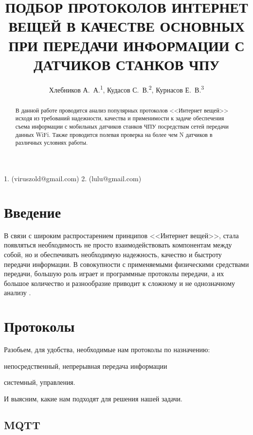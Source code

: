 \documentclass[russian]{article}
\begin{document}
\title{\textbf{ПОДБОР ПРОТОКОЛОВ ИНТЕРНЕТ ВЕЩЕЙ В КАЧЕСТВЕ ОСНОВНЫХ ПРИ ПЕРЕДАЧИ ИНФОРМАЦИИ С ДАТЧИКОВ СТАНКОВ ЧПУ}}

\author{Хлебников А.~А.\textsuperscript{1}, Кудасов С.~В.\textsuperscript{2}, Курнасов Е.~В.\textsuperscript{3}}

\maketitle
\thispagestyle{fancy}

1. (viruszold@gmail.com) 2. (lulu@gmail.com)
\begin{abstract}
В данной работе проводится анализ популярных протоколов <<Интернет вещей>> исходя из требований 
надежности, качества и применимости к задаче обеспечения съема информации с мобильных датчиков станков
ЧПУ посредствам сетей передачи данных WiFi. Также проводится полевая проверка на более чем N датчиков в 
различных условиях работы.
\end{abstract}

\section*{Введение}

В связи с широким распростарением принципов <<Интернет вещей>>, стала появляться необходимость 
не просто взаимодействовать компонентам между собой, но и обеспечивать необходимую надежность, 
качество и быстроту передачи информации. В совокупности с применяемыми физическими средствами передачи, большую роль
играет и программные протоколы передачи, а их большое количество и разнообразие приводит к сложному и 
не однозначному анализу \cite{IoT_Protocols_Research}.


\section*{Протоколы}

Разобьем, для удобства, необходимые нам протоколы по назначению:
\begin{enumerate*}[label={\alph*)},font={\color{red!50!black}\bfseries}]
\item непосредственный, непрерывная передача информации 
\item системный, управления.
 \end{enumerate*}
И выясним, какие нам подходят для решения нашей задачи.
 
\subsection*{MQTT\cite{MQTT}}
\end{document}

